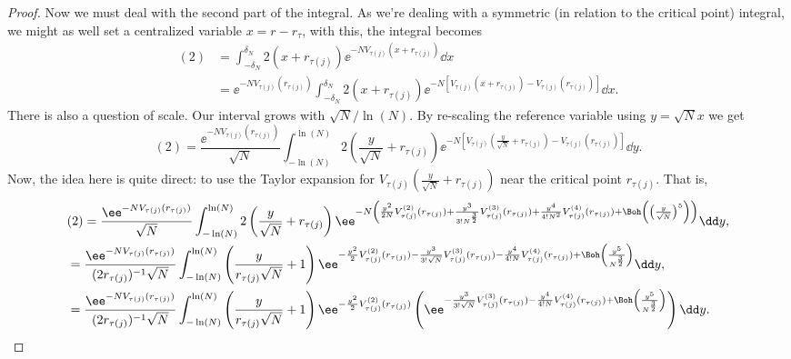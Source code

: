 \begin{proof}
	Now we must deal with the second part of the integral. As we're dealing with a symmetric (in relation to the critical point) integral, we might as well set a centralized variable $x = r - r_\tau$, with this, the integral becomes
	\begin{align}
		(2) & = \int_{-\delta_N}^{\delta_N} 2 (x + r_{\tau(j)}) \ee^{-N V_{\tau(j)}(x + r_{\tau(j)})} \dd x \\
		& = \ee^{-N V_{\tau(j)}(r_{\tau(j)})}  \int_{-\delta_N}^{\delta_N} 2 (x + r_{\tau(j)}) \ee^{-N \left[ V_{\tau(j)}(x + r_{\tau(j)}) - V_{\tau(j)}(r_{\tau(j)})\right]} \dd x.
	\end{align}
	There is also a question of scale. Our interval grows with $\sqrt{N}/\ln(N)$. By re-scaling the reference variable using $y = \sqrt{N} x$ we get
	\begin{equation}
		(2) = \frac{\ee^{-N V_{\tau(j)}(r_{\tau(j)})}}{\sqrt{N}}  \int_{-\ln(N)}^{\ln(N)} 2 \left(\frac{y}{\sqrt{N}} + r_{\tau(j)} \right) \ee^{-N \left[ V_{\tau(j)}(\frac{y}{\sqrt{N}} + r_{\tau(j)}) - V_{\tau(j)}(r_{\tau(j)})\right]} \dd y.
	\end{equation}
	Now, the idea here is quite direct: to use the Taylor expansion for $V_{\tau(j)}\left(\frac{y}{\sqrt{N}} + r_{\tau(j)}\right )$ near the critical point $r_{\tau(j)}$. That is,  
	\begin{align}
		& (2) =\frac{\ee^{-N V_{\tau(j)}(r_{\tau(j)})}}{\sqrt{N}}  \int_{-\ln(N)}^{\ln(N)} 2 \left(\frac{y}{\sqrt{N}} + r_{\tau(j)} \right) \ee^{-N \left(\frac{y^2}{2N} V^{(2)}_{\tau(j)}(r_{\tau(j)}) + \frac{y^3}{3! N^{\frac{3}{2}}} V^{(3)}_{\tau(j)}(r_{\tau(j)}) + \frac{y^4}{4! N^2} V^{(4)}_{\tau(j)}(r_{\tau(j)})+ \Boh\left(\left(\frac{y}{\sqrt{N}}\right)^5\right) \right)} \dd y, \\
		& = \frac{\ee^{-N V_{\tau(j)}(r_{\tau(j)})}}{(2 r_{\tau(j)} )^{-1}\sqrt{N}}  \int_{-\ln(N)}^{\ln(N)} \left(\frac{y}{r_{\tau(j)}\sqrt{N}} + 1 \right) \ee^{-\frac{y^2}{2} V^{(2)}_{\tau(j)}(r_{\tau(j)}) - \frac{y^3}{3! \sqrt{N}} V^{(3)}_{\tau(j)}(r_{\tau(j)}) - \frac{y^4}{4! N} V^{(4)}_{\tau(j)}(r_{\tau(j)}) + \Boh\left(\frac{y^5}{N^\frac{3}{2}}\right)} \dd y, \\
		& = \frac{\ee^{-N V_{\tau(j)}(r_{\tau(j)})}}{(2 r_{\tau(j)} )^{-1}\sqrt{N}}  \int_{-\ln(N)}^{\ln(N)} \left(\frac{y}{r_{\tau(j)}\sqrt{N}} + 1 \right) \ee^{-\frac{y^2}{2} V^{(2)}_{\tau(j)}(r_{\tau(j)})} \left(\ee^{- \frac{y^3}{3! \sqrt{N}} V^{(3)}_{\tau(j)}(r_{\tau(j)}) - \frac{y^4}{4! N} V^{(4)}_{\tau(j)}(r_{\tau(j)}) + \Boh\left(\frac{y^5}{N^\frac{3}{2}}\right)}\right) \dd y.

\end{align}
\end{proof}
